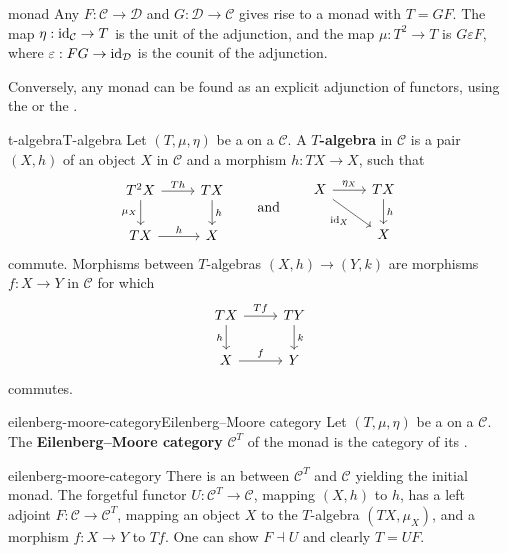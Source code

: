 \begin{example}{monad}
    Any  $F : \mathcal{C} \to \mathcal{D}$ and $G : \mathcal{D} \to \mathcal{C}$ gives rise to a monad with $T = GF$. The map $\eta : \textup{id}_{\mathcal{C}} \to T$ is the unit of the adjunction, and the map $\mu : T^2 \to T$ is $G \varepsilon F$, where $\varepsilon : FG \to \textup{id}_{\mathcal{D}}$ is the counit of the adjunction.
    
    Conversely, any monad can be found as an explicit adjunction of functors, using the  or the .
\end{example}

\begin{topic}{t-algebra}{T-algebra}
    Let $(T, \mu, \eta)$ be a  on a  $\mathcal{C}$. A \textbf{$T$-algebra} in $\mathcal{C}$ is a pair $(X, h)$ of an object $X$ in $\mathcal{C}$ and a morphism $h : TX \to X$, such that
    \[ \begin{tikzcd} T^2 X \arrow[swap]{d}{\mu_X} \arrow{r}{Th} & TX \arrow{d}{h} \\ TX \arrow{r}{h} & X \end{tikzcd} \qquad \text{and} \qquad \begin{tikzcd} X \arrow[swap]{dr}{\id_X} \arrow{r}{\eta_X} & TX \arrow{d}{h} \\ & X \end{tikzcd} \]
    commute. Morphisms between $T$-algebras $(X, h) \to (Y, k)$ are morphisms $f : X \to Y$ in $\mathcal{C}$ for which
    \[ \begin{tikzcd} TX \arrow{r}{Tf} \arrow[swap]{d}{h} & TY \arrow{d}{k} \\ X \arrow{r}{f} & Y \end{tikzcd} \]
    commutes.
\end{topic}

\begin{topic}{eilenberg-moore-category}{Eilenberg--Moore category}
    Let $(T, \mu, \eta)$ be a  on a  $\mathcal{C}$. The \textbf{Eilenberg--Moore category} $\mathcal{C}^T$ of the monad is the category of its .
\end{topic}

\begin{example}{eilenberg-moore-category}
    There is an  between $\mathcal{C}^T$ and $\mathcal{C}$ yielding the initial monad. The forgetful functor $U : \mathcal{C}^T \to \mathcal{C}$, mapping $(X, h)$ to $h$, has a left adjoint $F : \mathcal{C} \to \mathcal{C}^T$, mapping an object $X$ to the $T$-algebra $(TX, \mu_X)$, and a morphism $f : X \to Y$ to $Tf$. One can show $F \dashv U$ and clearly $T = UF$.
\end{example}

